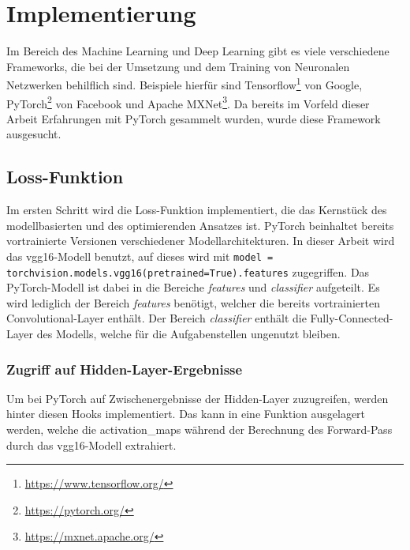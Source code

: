 \chapter{Implementierung}
\label{cha:implementation}

Im Bereich des Machine Learning und Deep Learning gibt es viele verschiedene Frameworks, die bei der Umsetzung und dem Training von Neuronalen Netzwerken behilflich sind. Beispiele hierfür sind Tensorflow\footnote{\url{https://www.tensorflow.org/}} von Google, PyTorch\footnote{\url{https://pytorch.org/}} von Facebook und Apache MXNet\footnote{\url{https://mxnet.apache.org/}}. Da bereits im Vorfeld dieser Arbeit Erfahrungen mit PyTorch gesammelt wurden, wurde diese Framework ausgesucht.

\section{Loss-Funktion}

Im ersten Schritt wird die Loss-Funktion implementiert, die das Kernstück des modellbasierten und des optimierenden Ansatzes ist.
PyTorch beinhaltet bereits vortrainierte Versionen verschiedener Modellarchitekturen. In dieser Arbeit wird das \gls{vgg16}-Modell benutzt, auf dieses wird mit \texttt{model = torchvision.models.vgg16(pretrained=True).features} zugegriffen. Das PyTorch-Modell ist dabei in die Bereiche \textit{features} und \textit{classifier} aufgeteilt. Es wird lediglich der Bereich \textit{features} benötigt, welcher die bereits vortrainierten Convolutional-Layer enthält. Der Bereich \textit{classifier} enthält die Fully-Connected-Layer des Modells, welche für die Aufgabenstellen ungenutzt bleiben.

\pagebreak

\subsection{Zugriff auf Hidden-Layer-Ergebnisse}

Um bei PyTorch auf Zwischenergebnisse der Hidden-Layer zuzugreifen, werden hinter diesen Hooks implementiert. Das kann in eine Funktion ausgelagert werden, welche die \gls{activation_map}s während der Berechnung des Forward-Pass durch das \gls{vgg16}-Modell extrahiert.

